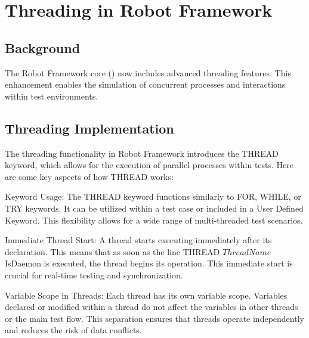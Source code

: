 %
%
%

\chapter{Threading in Robot Framework}

\section{Background}

The Robot Framework core (\rfwcore) now includes advanced threading features. This enhancement enables the simulation of concurrent processes and interactions within test environments.

\section{Threading Implementation}

The threading functionality in Robot Framework introduces the THREAD keyword, which allows for the execution of parallel processes within tests. Here are some key aspects of how THREAD works:

Keyword Usage:
The THREAD keyword functions similarly to FOR, WHILE, or TRY keywords. It can be utilized within a test case or included in a User Defined Keyword. This flexibility allows for a wide range of multi-threaded test scenarios.

Immediate Thread Start:
A thread starts executing immediately after its declaration. This means that as soon as the line THREAD ${ThreadName} ${IsDaemon} is executed, the thread begins its operation. This immediate start is crucial for real-time testing and synchronization.

Variable Scope in Threads:
Each thread has its own variable scope. Variables declared or modified within a thread do not affect the variables in other threads or the main test flow. This separation ensures that threads operate independently and reduces the risk of data conflicts.

